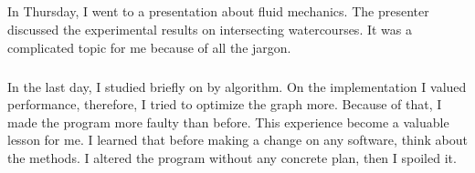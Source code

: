 \documentclass{article}
\begin{document}
\subparagraph{}
In Thursday, I went to a presentation about fluid mechanics. The presenter discussed the experimental results on intersecting watercourses. It was a complicated topic for me because of all the jargon. 
    
\subparagraph{}
In the last day, I studied briefly on by algorithm. On the implementation I valued performance, therefore, I tried to optimize the graph more. Because of that, I made the program more faulty than before. This experience become a valuable lesson for me. I learned that before making a change on any software, think about the methods. I altered the program without any concrete plan, then I spoiled it. 

\printbibliography
\end{document}
